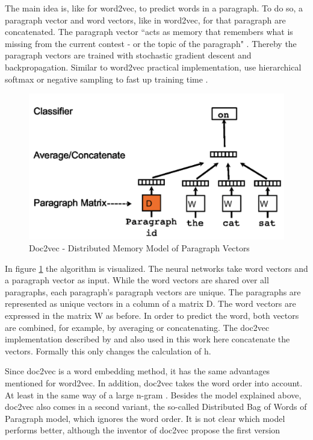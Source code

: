\documentclass[12pt, a4paper, titlepage]{article}
\begin{document}
The main idea is, like for word2vec, to predict words in a paragraph. To do so, a paragraph vector and word vectors, like in word2vec, for that paragraph are concatenated. The paragraph vector ``acts as memory that remembers what is missing from the current contest - or the topic of the paragraph" \citep[3]{le2014}. Thereby the paragraph vectors are trained with stochastic gradient descent and backpropagation. Similar to word2vec practical implementation, use hierarchical softmax or negative sampling to fast up training time \citep{lau2016}. 

\begin{figure}[]
  \center
  \includegraphics[scale=0.5]{doc2vec.png}
  \caption[Doc2vec - Distributed Memory Model of Paragraph Vectors]{\label{fig: F2} Doc2vec - Distributed Memory Model of Paragraph Vectors \citep[3]{le2014}}
\end{figure}

In figure \ref{fig: F2} the algorithm is visualized. The neural networks take word vectors and a paragraph vector as input. While the word vectors are shared over all paragraphs, each paragraph's paragraph vectors are unique. The paragraphs are represented as unique vectors in a column of a matrix D. The word vectors are expressed in the matrix W as before. In order to predict the word, both vectors are combined, for example, by averaging or concatenating. The doc2vec implementation described by \citet{le2014} and also used in this work here concatenate the vectors. Formally this only changes the calculation of h. \citep{lau2016}

Since doc2vec is a word embedding method, it has the same advantages mentioned for word2vec. In addition, doc2vec takes the word order into account. At least in the same way of a large n-gram \citep{le2014}. Besides the model explained above, doc2vec also comes in a second variant, the so-called Distributed Bag of Words of Paragraph model, which ignores the word order. It is not clear which model performs better, although the inventor of doc2vec propose the first version \citep{lau2016}
\end{document}
